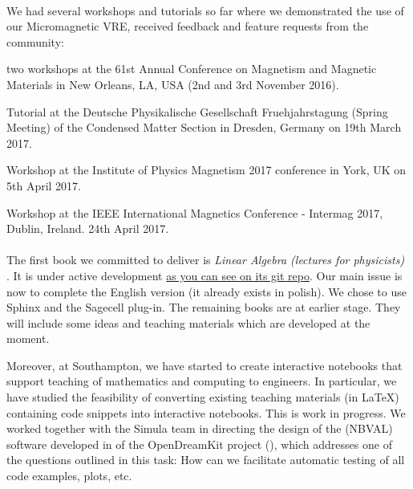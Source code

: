 \documentclass{deliverablereport}
\begin{document}
\paragraph{}
\label{dissem@dissemination-of-oommf-nb-workshops}

We had several workshops and tutorials so far where we demonstrated the use of our Micromagnetic VRE, received feedback and feature requests from the community:

\begin{compactitem}
\item two workshops at the 61st Annual Conference on Magnetism and Magnetic Materials in New Orleans,
    LA, USA (2nd and 3rd November 2016).
\item Tutorial at the Deutsche Physikalische Gesellschaft Fruehjahrstagung (Spring Meeting) of the Condensed Matter Section in Dresden, Germany on 19th March 2017.
\item Workshop at the Institute of Physics Magnetism 2017 conference in York, UK on 5th April 2017.
\item Workshop at the IEEE International Magnetics Conference - Intermag 2017, Dublin, Ireland. 24th April 2017.
\end{compactitem}

\paragraph{}


The first book we committed to deliver is \emph{Linear Algebra (lectures for physicists)} . It is under active development \href{https://github.com/Hadriamit/iODKbook2}{as you can see on its git repo}. Our main issue is now to complete the English version (it already exists in polish). We chose to use Sphinx and the Sagecell plug-in. The remaining books are at earlier stage. They will include some ideas and teaching materials which are developed at the moment.

Moreover, at Southampton, we have started to create interactive notebooks that support teaching of mathematics and computing to engineers. In particular, we have studied the feasibility of converting existing teaching materials (in LaTeX) containing code snippets into interactive notebooks. This is work in progress. We worked together with the Simula team in directing the design of the (NBVAL) software developed in  of the OpenDreamKit project (), which addresses one of the questions outlined in this task: How can we facilitate automatic testing of all code examples, plots, etc.
\end{document}
